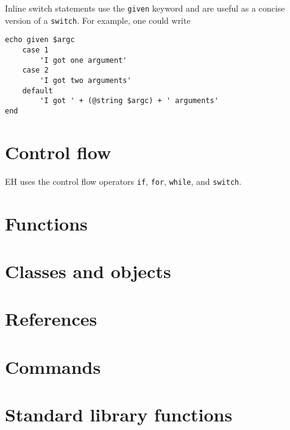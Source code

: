 \documentclass{article}
\begin{document}
Inline switch statements use the \verb#given# keyword and are useful as a concise version of a \verb#switch#. For example, one could write
\begin{verbatim}
echo given $argc
	case 1
		'I got one argument'
	case 2
		'I got two arguments'
	default
		'I got ' + (@string $argc) + ' arguments'
end
\end{verbatim}

\section{Control flow}
EH uses the control flow operators \verb#if#, \verb#for#, \verb#while#, and \verb#switch#. 
\section{Functions}

\section{Classes and objects}

\section{References}

\section{Commands}

\section{Standard library functions}
\end{document}
